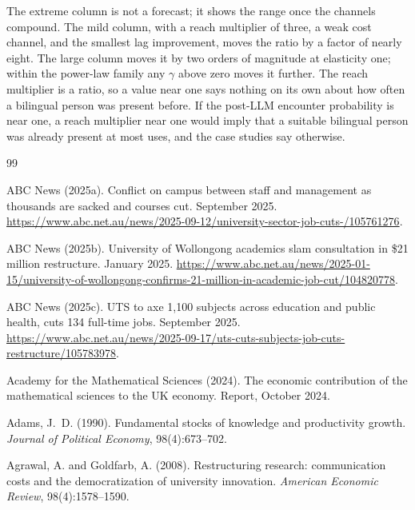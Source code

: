 \documentclass[11pt]{article}
\theoremstyle{definition}
\theoremstyle{remark}
\begin{document}
The extreme column is not a forecast; it shows the range once the channels compound. The mild column, with a reach multiplier of three, a weak cost channel, and the smallest lag improvement, moves the ratio by a factor of nearly eight. The large column moves it by two orders of magnitude at elasticity one; within the power-law family any $\gamma$ above zero moves it further. The reach multiplier is a ratio, so a value near one says nothing on its own about how often a bilingual person was present before. If the post-LLM encounter probability is near one, a reach multiplier near one would imply that a suitable bilingual person was already present at most uses, and the case studies say otherwise.

\begin{thebibliography}{99}

ABC News (2025a).
\newblock Conflict on campus between staff and management as thousands are sacked and courses cut.
 September 2025. \url{https://www.abc.net.au/news/2025-09-12/university-sector-job-cuts-/105761276}.

ABC News (2025b).
\newblock University of Wollongong academics slam consultation in \$21 million restructure.
 January 2025. \url{https://www.abc.net.au/news/2025-01-15/university-of-wollongong-confirms-21-million-in-academic-job-cut/104820778}.

ABC News (2025c).
\newblock UTS to axe 1,100 subjects across education and public health, cuts 134 full-time jobs.
 September 2025. \url{https://www.abc.net.au/news/2025-09-17/uts-cuts-subjects-job-cuts-restructure/105783978}.

Academy for the Mathematical Sciences (2024).
\newblock The economic contribution of the mathematical sciences to the UK economy.
\newblock Report, October 2024.

Adams, J.~D. (1990).
\newblock Fundamental stocks of knowledge and productivity growth.
\newblock \emph{Journal of Political Economy}, 98(4):673--702.

Agrawal, A. and Goldfarb, A. (2008).
\newblock Restructuring research: communication costs and the democratization of university innovation.
\newblock \emph{American Economic Review}, 98(4):1578--1590.


\end{thebibliography}
\end{document}
